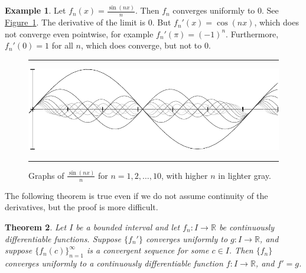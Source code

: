 \documentclass[12pt,openany]{book}
\newcommand{\R}{{\mathbb{R}}}
\theoremstyle{plain}
\newtheorem{thm}{Theorem}[section]
\theoremstyle{remark}
\theoremstyle{definition}
\newenvironment{myfig}{%
\begin{figure}[h!t]
\noindent\rule{\textwidth}{0.4pt}\vspace{12pt}\par\centering}%
{\par\noindent\rule{\textwidth}{0.4pt}
\end{figure}}
\theoremstyle{exercise}
\theoremstyle{example}
\newtheorem{example}[thm]{Example}
\newcommand{\figureref}[1]{\hyperref[#1]{Figure~\ref*{#1}}}
\begin{document}
\begin{example}
Let $f_n(x) = \frac{\sin(nx)}{n}$.
Then $f_n$ converges uniformly to $0$.
See \figureref{fig:conv1nsinxn}.
The derivative of the limit is $0$.
But $f_n'(x) = \cos(nx)$,
which does not converge even pointwise,
for example $f_n'(\pi) = {(-1)}^n$.
Furthermore, $f_n'(0) = 1$ for all $n$, which does converge, but not to $0$.
\begin{myfig}
\includegraphics{figures/conv1nsinxn}
\caption{Graphs of $\frac{\sin(nx)}{n}$ for
$n=1,2,\ldots,10$, with higher $n$ in lighter gray.%
\label{fig:conv1nsinxn}}
\end{myfig}
\end{example}

The following theorem is true even if 
we do not assume continuity of the derivatives, but the proof is more
difficult.

\begin{thm} \label{thm:dersconverge}
Let $I$ be a bounded interval and let
$f_n \colon I \to \R$ be continuously differentiable functions.
Suppose $\{ f_n' \}$ converges uniformly to $g \colon I \to \R$,
and suppose $\{ f_n(c) \}_{n=1}^\infty$ is a
convergent sequence for some $c \in I$.  Then $\{ f_n \}$ converges uniformly to 
a continuously differentiable function $f \colon I \to \R$, and $f' = g$.
\end{thm}
\end{document}
